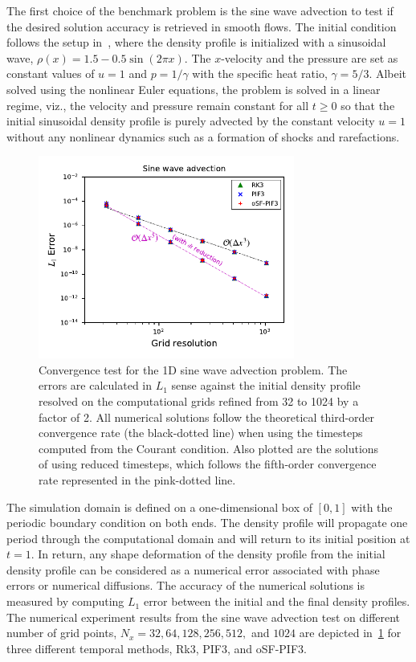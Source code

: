 The first choice of the benchmark problem is the sine wave advection
to test if the desired solution accuracy is retrieved in smooth flows.
The initial condition follows the setup in~\cite{lee2017piecewise},
where the density profile is initialized with a sinusoidal wave,
\( \rho (x) = 1.5 - 0.5\sin(2\pi x)\).
The $x$-velocity and
the pressure are set as constant values of \( u = 1\) and
\( p = 1/\gamma \)
with the specific heat ratio, \( \gamma = 5/3 \).
Albeit solved using the nonlinear Euler equations, the problem is
solved in a linear regime, viz., the velocity and pressure remain
constant for all $t\ge 0$ so that the initial sinusoidal density profile
is purely advected by the constant velocity $u=1$ without any nonlinear
dynamics such as a formation of shocks and rarefactions.

\begin{figure}
    \centering
    \includegraphics[width=0.75\textwidth]{fig/sine_over_dtReduction}
    \caption{Convergence test for the 1D sine wave advection problem.
        The errors are calculated
        in \( L_{1} \) sense against the initial density profile
        resolved on the computational grids refined
        from 32 to 1024 by a factor of 2.
        All numerical solutions follow the theoretical third-order convergence rate
        (the black-dotted line) when using the timesteps 
        computed from the Courant condition.
        Also plotted are the solutions of using reduced timesteps, which follows the
        fifth-order convergence rate represented in the pink-dotted line.
    }\label{fig:sine_wave}
\end{figure}

The simulation domain is defined on a one-dimensional box of \( [0, 1] \)
with the periodic boundary condition on both ends.
The density profile will propagate one period through the computational domain
and will return to its initial position at \( t = 1 \).
In return, any shape deformation of the density profile
from the initial density profile can be considered as a numerical error
associated with phase errors or numerical diffusions.
The accuracy of the numerical solutions is measured by computing \( L_{1} \) error
between the initial and the final density profiles.
The numerical experiment results from the sine wave advection test
on different number of grid points, \( N_{x} = 32, 64, 128, 256, 512, \) and \( 1024 \)
are depicted in~\cref{fig:sine_wave} for three different temporal methods, Rk3, PIF3, and oSF-PIF3.

